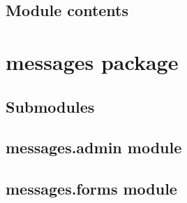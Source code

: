 \documentclass[letterpaper,10pt,english]{sphinxmanual}
\begin{document}

\begin{fulllineitems}
\label{medicament:medicament.views.list_vaccine}
\end{fulllineitems}


\begin{fulllineitems}
\label{medicament:medicament.views.list_wormer}
\end{fulllineitems}



\subsection{Module contents}
\label{medicament:module-medicament}\label{medicament:module-contents}

\section{messages package}
\label{messages:messages-package}\label{messages::doc}

\subsection{Submodules}
\label{messages:submodules}

\subsection{messages.admin module}
\label{messages:messages-admin-module}\label{messages:module-messages.admin}

\subsection{messages.forms module}
\label{messages:messages-forms-module}\label{messages:module-messages.forms}
\end{document}
